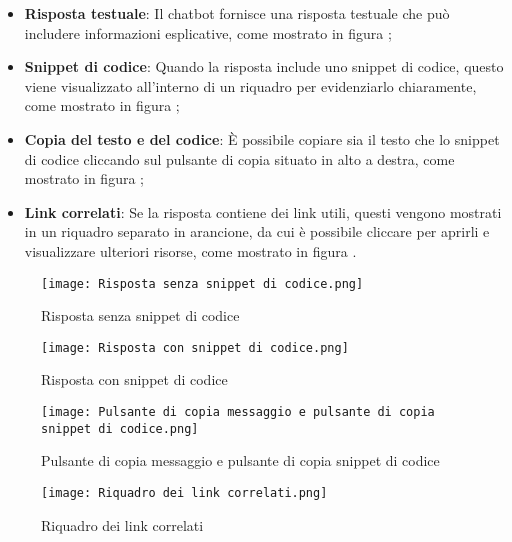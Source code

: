 \begin{itemize}
  \item \textbf{Risposta testuale}: Il chatbot fornisce una risposta testuale che può includere informazioni esplicative, come mostrato in figura ;
  \item \textbf{Snippet di codice}: Quando la risposta include uno snippet di codice, questo viene visualizzato all'interno di un riquadro per evidenziarlo chiaramente, come mostrato in figura ;
  \item \textbf{Copia del testo e del codice}: È possibile copiare sia il testo che lo snippet di codice cliccando sul pulsante di copia situato in alto a destra, come mostrato in figura ;
  \item \textbf{Link correlati}: Se la risposta contiene dei link utili, questi vengono mostrati in un riquadro separato in arancione, da cui è possibile cliccare per aprirli e visualizzare ulteriori risorse, come mostrato in figura .
\end{itemize}

\newpage
\begin{figure}[h]
    \centering
        \texttt{[image: Risposta senza snippet di codice.png]}
        \caption{Risposta senza snippet di codice}
        \label{fig:Risposta senza snippet di codice}        
\end{figure}
\begin{figure}[h]
    \centering
        \texttt{[image: Risposta con snippet di codice.png]}
        \caption{Risposta con snippet di codice}
        \label{fig:Risposta con snippet di codice}        
\end{figure}
\newpage
\begin{figure}[h]
    \centering
        \texttt{[image: Pulsante di copia messaggio e pulsante di copia snippet di codice.png]}
        \caption{Pulsante di copia messaggio e pulsante di copia snippet di codice}
        \label{fig:Pulsante di copia messaggio e pulsante di copia snippet di codice}        
\end{figure}
\begin{figure}[h]
    \centering
        \texttt{[image: Riquadro dei link correlati.png]}
        \caption{Riquadro dei link correlati}
        \label{fig:Riquadro dei link correlati}        
\end{figure}


